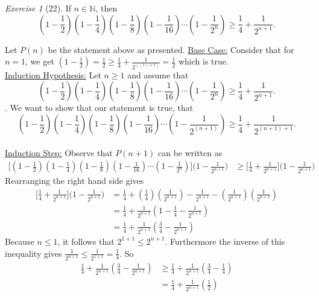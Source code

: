 \documentclass[12pt]{amsart}
\makeatletter
\theoremstyle{remark}
\newtheorem*{exercise}{Exercise}%
\def\NN{\ensuremath{\mathbb N}}
\renewenvironment{proof}[1][\proofname]{\par\doublespacing
  \pushQED{\qed}%
  \normalfont \topsep6\p@\@plus6\p@\relax
  \list{}{%
    \settowidth{\leftmargin}{\itshape\proofname:\hskip\labelsep}%
    \setlength{\labelwidth}{0pt}%
    \setlength{\itemindent}{-\leftmargin}%
  }%
  \item[\hskip\labelsep\itshape#1\@addpunct{:}]\ignorespaces
}{%
  \popQED\endlist\@endpefalse
  \singlespacing
}
\theoremstyle{mycomment}
\makeatother
\begin{document}
\begin{exercise}[22] If $n\in\NN$, then $$\left(1-\frac{1}{2}\right)\left(1-\frac{1}{4}\right)\left(1-\frac{1}{8}\right)\left(1-\frac{1}{16}\right)\cdots\left(1-\frac{1}{2^{n}}\right)\ge \frac{1}{4}+\frac{1}{2^{n+1}}.$$
\begin{proof}
  Let $P(n)$ be the statement above as presented.
  \underline{Base Case:} Consider that for $n=1$, we get $(1 - \frac{1}{2}) = \frac{1}{2} \geq \frac{1}{4} + \frac{1}{2^{((1) + 1)}} = \frac{1}{2}$ which is true. \\
  \underline{Induction Hypothesis:} Let $n \geq 1$ and assume that $$\left(1-\frac{1}{2}\right)\left(1-\frac{1}{4}\right)\left(1-\frac{1}{8}\right)\left(1-\frac{1}{16}\right)\cdots\left(1-\frac{1}{2^{n}}\right)\ge \frac{1}{4}+\frac{1}{2^{n+1}}.$$. We want to show that our statement is true, that $$\left(1-\frac{1}{2}\right)\left(1-\frac{1}{4}\right)\left(1-\frac{1}{8}\right)\left(1-\frac{1}{16}\right)\cdots\left(1-\frac{1}{2^{(n+1)}}\right)\ge \frac{1}{4}+\frac{1}{2^{(n+1)+1}}.$$ \\
  \underline{Induction Step:} Observe that $P(n+1)$ can be written as
  \begin{align*}
    \biggl[\left(1-\frac{1}{2}\right)\left(1-\frac{1}{4}\right)\left(1-\frac{1}{8}\right)\left(1-\frac{1}{16}\right)\cdots\left(1-\frac{1}{2^{n}}\right) \biggr] \biggl(1 - \frac{1}{2^{n+1}} \biggr) &\ge \biggl[\frac{1}{4}+\frac{1}{2^{n+1}}\biggr] \biggl(1 - \frac{1}{2^{n+1}} \biggr) 
  \end{align*}
  Rearranging the right hand side gives
  \begin{align*}
\biggl[\frac{1}{4}+\frac{1}{2^{n+1}}\biggr] \biggl(1 - \frac{1}{2^{n+1}} \biggr) 
  &=\frac{1}{4} + (\frac{1}{4})(\frac{1}{2^{n+1}}) - \frac{1}{2^{n+1}} - (\frac{1}{2^{n+1}})(\frac{1}{2^{n+1}}) \\
  &= \frac{1}{4} + \frac{1}{2^{n+1}}(1 - \frac{1}{4} - \frac{1}{2^{n+1}}) \\
  &= \frac{1}{4} + \frac{1}{2^{n+1}}(\frac{3}{4} - \frac{1}{2^{n+1}})
  \end{align*}
  Because $n \leq 1$, it follows that $2^{1+1} \leq 2^{n+1}$. Furthermore the inverse of this inequality gives $\frac{1}{2^{n+1}} \leq \frac{1}{2^{1+1}} = \frac{1}{4}$. So
  \begin{align*}
  \frac{1}{4} + \frac{1}{2^{n+1}}(\frac{3}{4} - \frac{1}{2^{n+1}}) &\geq \frac{1}{4} + \frac{1}{2^{n+1}}(\frac{3}{4} - \frac{1}{4}) \\
                                                                   &= \frac{1}{4} + \frac{1}{2^{n+1}}(\frac{1}{2}) \\

\end{align*}
\end{proof}
\end{exercise}
\end{document}
